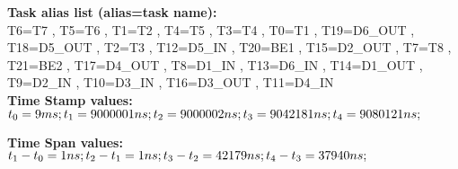 \documentclass[landscape,a4paper,10pt]{article}
\begin{document}
\textbf{Task alias list (alias=task name):}\\
T6=T7 , 
T5=T6 , 
T1=T2 , 
T4=T5 , 
T3=T4 , 
T0=T1 , 
T19=D6_OUT , 
T18=D5_OUT , 
T2=T3 , 
T12=D5_IN , 
T20=BE1 , 
T15=D2_OUT , 
T7=T8 , 
T21=BE2 , 
T17=D4_OUT , 
T8=D1_IN , 
T13=D6_IN , 
T14=D1_OUT , 
T9=D2_IN , 
T10=D3_IN , 
T16=D3_OUT , 
T11=D4_IN\\

\textbf{Time Stamp values:}\\
$t_{0} = 9 ms; t_{1} = 9000001 ns; t_{2} = 9000002 ns; t_{3} = 9042181 ns; t_{4} = 9080121 ns;  \\
$

\textbf{Time Span values:}\\
$t_{1} - t_{0} = 1 ns; t_{2} - t_{1} = 1 ns; t_{3} - t_{2} = 42179 ns; t_{4} - t_{3} = 37940 ns;  \\
$
\end{document}
